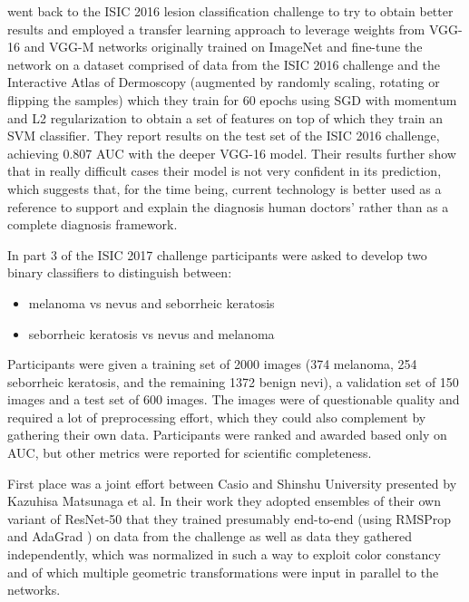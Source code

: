 \citeauthor{menegola2017} \cite{menegola2017} went back to the \ac{ISIC} 2016 lesion classification challenge to try to obtain better results and employed a transfer learning approach to leverage weights from VGG-16 and VGG-M networks originally trained on ImageNet and fine-tune the network on a dataset comprised of data from the \ac{ISIC} 2016 challenge and the Interactive Atlas of Dermoscopy (augmented by randomly scaling, rotating or flipping the samples) which they train for 60 epochs using \ac{SGD} with momentum and L2 regularization to obtain a set of features on top of which they train an SVM classifier. They report results on the test set of the \ac{ISIC} 2016 challenge, achieving 0.807 AUC with the deeper VGG-16 model. Their results further show that in really difficult cases their model is not very confident in its prediction, which suggests that, for the time being, current technology is better used as a reference to support and explain the diagnosis human doctors' rather than as a complete diagnosis framework.

In part 3 of the \ac{ISIC} 2017 \cite{isic2017} challenge participants were asked to develop two binary classifiers to distinguish between:

\begin{itemize}
    \item melanoma vs nevus and seborrheic keratosis
    \item seborrheic keratosis vs nevus and melanoma
\end{itemize}

Participants were given a training set of 2000 images (374 melanoma, 254 seborrheic keratosis, and the remaining 1372 benign nevi), a validation set of 150 images and a test set of 600 images. The images were of questionable quality and required a lot of preprocessing effort, which they could also complement by gathering their own data. Participants were ranked and awarded based only on AUC, but other metrics were reported for scientific completeness.

First place was a joint effort between Casio and Shinshu University presented by Kazuhisa Matsunaga et al\cite{isic2017first}. In their work they adopted ensembles of their own variant of ResNet-50 that they trained presumably end-to-end (using RMSProp \cite{rmsprop} and AdaGrad \cite{adagrad}) on data from the challenge as well as data they gathered independently, which was normalized in such a way to exploit color constancy and of which multiple geometric transformations were input in parallel to the networks.

